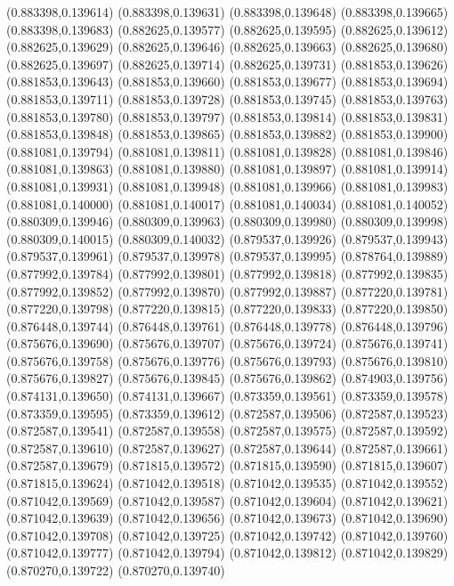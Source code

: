 (0.883398,0.139614)
(0.883398,0.139631)
(0.883398,0.139648)
(0.883398,0.139665)
(0.883398,0.139683)
(0.882625,0.139577)
(0.882625,0.139595)
(0.882625,0.139612)
(0.882625,0.139629)
(0.882625,0.139646)
(0.882625,0.139663)
(0.882625,0.139680)
(0.882625,0.139697)
(0.882625,0.139714)
(0.882625,0.139731)
(0.881853,0.139626)
(0.881853,0.139643)
(0.881853,0.139660)
(0.881853,0.139677)
(0.881853,0.139694)
(0.881853,0.139711)
(0.881853,0.139728)
(0.881853,0.139745)
(0.881853,0.139763)
(0.881853,0.139780)
(0.881853,0.139797)
(0.881853,0.139814)
(0.881853,0.139831)
(0.881853,0.139848)
(0.881853,0.139865)
(0.881853,0.139882)
(0.881853,0.139900)
(0.881081,0.139794)
(0.881081,0.139811)
(0.881081,0.139828)
(0.881081,0.139846)
(0.881081,0.139863)
(0.881081,0.139880)
(0.881081,0.139897)
(0.881081,0.139914)
(0.881081,0.139931)
(0.881081,0.139948)
(0.881081,0.139966)
(0.881081,0.139983)
(0.881081,0.140000)
(0.881081,0.140017)
(0.881081,0.140034)
(0.881081,0.140052)
(0.880309,0.139946)
(0.880309,0.139963)
(0.880309,0.139980)
(0.880309,0.139998)
(0.880309,0.140015)
(0.880309,0.140032)
(0.879537,0.139926)
(0.879537,0.139943)
(0.879537,0.139961)
(0.879537,0.139978)
(0.879537,0.139995)
(0.878764,0.139889)
(0.877992,0.139784)
(0.877992,0.139801)
(0.877992,0.139818)
(0.877992,0.139835)
(0.877992,0.139852)
(0.877992,0.139870)
(0.877992,0.139887)
(0.877220,0.139781)
(0.877220,0.139798)
(0.877220,0.139815)
(0.877220,0.139833)
(0.877220,0.139850)
(0.876448,0.139744)
(0.876448,0.139761)
(0.876448,0.139778)
(0.876448,0.139796)
(0.875676,0.139690)
(0.875676,0.139707)
(0.875676,0.139724)
(0.875676,0.139741)
(0.875676,0.139758)
(0.875676,0.139776)
(0.875676,0.139793)
(0.875676,0.139810)
(0.875676,0.139827)
(0.875676,0.139845)
(0.875676,0.139862)
(0.874903,0.139756)
(0.874131,0.139650)
(0.874131,0.139667)
(0.873359,0.139561)
(0.873359,0.139578)
(0.873359,0.139595)
(0.873359,0.139612)
(0.872587,0.139506)
(0.872587,0.139523)
(0.872587,0.139541)
(0.872587,0.139558)
(0.872587,0.139575)
(0.872587,0.139592)
(0.872587,0.139610)
(0.872587,0.139627)
(0.872587,0.139644)
(0.872587,0.139661)
(0.872587,0.139679)
(0.871815,0.139572)
(0.871815,0.139590)
(0.871815,0.139607)
(0.871815,0.139624)
(0.871042,0.139518)
(0.871042,0.139535)
(0.871042,0.139552)
(0.871042,0.139569)
(0.871042,0.139587)
(0.871042,0.139604)
(0.871042,0.139621)
(0.871042,0.139639)
(0.871042,0.139656)
(0.871042,0.139673)
(0.871042,0.139690)
(0.871042,0.139708)
(0.871042,0.139725)
(0.871042,0.139742)
(0.871042,0.139760)
(0.871042,0.139777)
(0.871042,0.139794)
(0.871042,0.139812)
(0.871042,0.139829)
(0.870270,0.139722)
(0.870270,0.139740)
